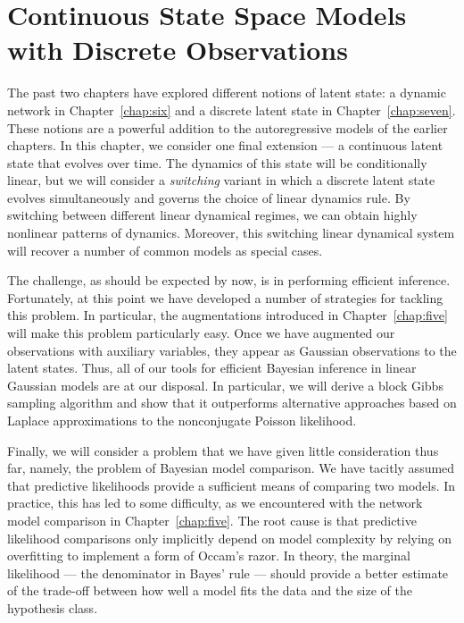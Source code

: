 \chapter{Continuous State Space Models with Discrete Observations}
\label{chap:eight}

The past two chapters have explored different notions of latent
state: a dynamic network in Chapter~\ref{chap:six} and a discrete
latent state in Chapter~\ref{chap:seven}. These notions are a powerful
addition to the autoregressive models of the earlier chapters. In
this chapter, we consider one final extension --- a continuous
latent state that evolves over time. The dynamics of this state will
be conditionally linear, but we will consider a \emph{switching}
variant in which a discrete latent state evolves simultaneously and
governs the choice of linear dynamics rule. By switching between
different linear dynamical regimes, we can obtain highly nonlinear
patterns of dynamics. Moreover, this switching linear dynamical
system will recover a number of common models as special cases. 

The challenge, as should be expected by now, is in performing efficient
inference. Fortunately, at this point we have developed a number of
strategies for tackling this problem. In particular, the \polyagamma
augmentations introduced in Chapter~\ref{chap:five} will make this
problem particularly easy. Once we have augmented our observations
with auxiliary variables, they appear as Gaussian observations to
the latent states. Thus, all of our tools for efficient Bayesian
inference in linear Gaussian models are at our disposal. In particular,
we will derive a block Gibbs sampling algorithm and show that it
outperforms alternative approaches based on Laplace approximations
to the nonconjugate Poisson likelihood.

Finally, we will consider a problem that we have given little
consideration thus far, namely, the problem of Bayesian model
comparison.  We have tacitly assumed that predictive likelihoods
provide a sufficient means of comparing two models. In practice, this
has led to some difficulty, as we encountered with the network model
comparison in Chapter~\ref{chap:five}. The root cause is that
predictive likelihood comparisons only implicitly depend on model
complexity by relying on overfitting to implement a form of Occam's
razor.  In theory, the marginal likelihood --- the denominator in
Bayes' rule --- should provide a better estimate of the trade-off
between how well a model fits the data and the size of the hypothesis
class.

